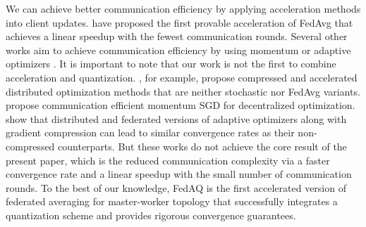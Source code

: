 We can achieve better communication efficiency by applying acceleration methods into client updates. \citet{yuan2020federated} have proposed the first provable acceleration of FedAvg that achieves a linear speedup with the fewest communication rounds. Several other works aim to achieve communication efficiency by using momentum or adaptive optimizers \citep{yu2019linear, karimireddy2020mime, wang2021local}. It is important to note that our work is not the first to combine acceleration and quantization.  \citet{li2020acceleration, li2021canita}, for example, propose compressed and accelerated distributed optimization methods that are neither stochastic nor FedAvg variants. \citet{singh2021squarm} propose communication efficient momentum SGD for decentralized optimization. \citet{li2022distributed, wang2022communication} show that distributed and federated versions of adaptive optimizers along with gradient compression can lead to similar convergence rates as their non-compressed counterparts. But these works do not achieve the core result of the present paper, which is the reduced communication complexity via a faster convergence rate and a linear speedup with the small number of communication rounds. To the best of our knowledge, FedAQ is the first accelerated version of federated averaging for master-worker topology that successfully integrates a quantization scheme and provides rigorous convergence guarantees.